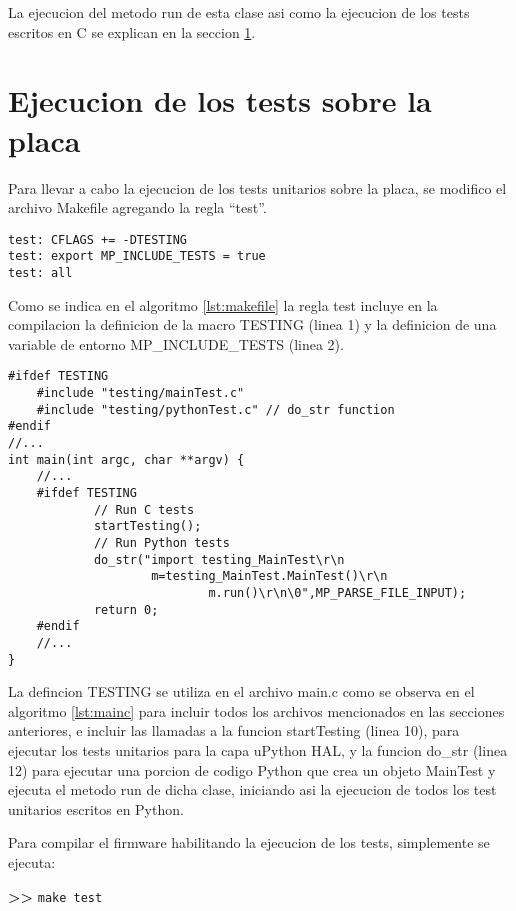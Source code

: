 La ejecucion del metodo run de esta clase asi como la ejecucion de los tests escritos en C se explican en la seccion \ref{sec:testUnitariosPlaca}.

\section{Ejecucion de los tests sobre la placa}
\label{sec:testUnitariosPlaca}

Para llevar a cabo la ejecucion de los tests unitarios sobre la placa, se modifico el archivo Makefile agregando la regla "`test"'. 

\begin{lstlisting}[label={lst:makefile},caption=Regla test en Makefile.]
test: CFLAGS += -DTESTING
test: export MP_INCLUDE_TESTS = true
test: all 
\end{lstlisting}

Como se indica en el algoritmo \ref{lst:makefile} la regla test incluye en la compilacion la definicion de la macro TESTING (linea 1) y la definicion de una variable de entorno MP\_INCLUDE\_TESTS (linea 2).

\begin{lstlisting}[label={lst:mainc},caption=Inclusion de los archivos de test en el main.]
#ifdef TESTING
    #include "testing/mainTest.c"
    #include "testing/pythonTest.c" // do_str function
#endif
//...
int main(int argc, char **argv) {
	//...
	#ifdef TESTING
			// Run C tests
			startTesting();
			// Run Python tests
			do_str("import testing_MainTest\r\n
			        m=testing_MainTest.MainTest()\r\n
							m.run()\r\n\0",MP_PARSE_FILE_INPUT);
			return 0;
	#endif
	//...
}
\end{lstlisting}

La defincion TESTING se utiliza en el archivo main.c como se observa en el algoritmo \ref{lst:mainc} para incluir todos los archivos mencionados en las secciones anteriores, e incluir las llamadas a la funcion startTesting (linea 10), para ejecutar los tests unitarios para la capa uPython HAL, y la funcion do\_str (linea 12) para ejecutar una porcion de codigo Python que crea un objeto MainTest y ejecuta el metodo run de dicha clase, iniciando asi la ejecucion de todos los test unitarios escritos en Python.

Para compilar el firmware habilitando la ejecucion de los tests, simplemente se ejecuta:

\textbf{{\fontsize{16}{16}\selectfont \textgreater\textgreater}} \texttt{make test}\\

